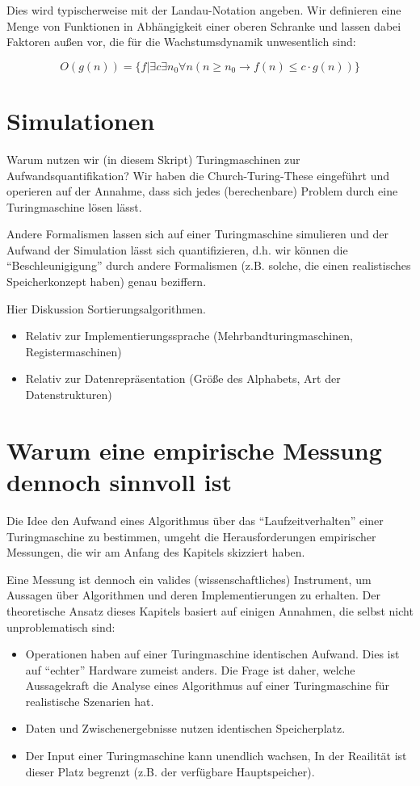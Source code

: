 Dies wird typischerweise mit der Landau-Notation angeben.
Wir definieren eine Menge von Funktionen in Abhängigkeit einer oberen Schranke
und lassen dabei Faktoren außen vor,
die für die Wachstumsdynamik unwesentlich sind:

\[
O(g(n)) = \{f|\exists c \exists n_0 \forall n (n \geq n_0 \rightarrow f(n) \leq c \cdot g(n))\}
\]


\section{Simulationen}

Warum nutzen wir (in diesem Skript) Turingmaschinen zur Aufwandsquantifikation?
Wir haben die Church-Turing-These eingeführt und operieren auf der Annahme,
dass sich jedes (berechenbare) Problem durch eine Turingmaschine lösen lässt.

Andere Formalismen lassen sich auf einer Turingmaschine simulieren und
der Aufwand der Simulation lässt sich quantifizieren,
d.h. wir können die ``Beschleunigigung'' durch andere Formalismen
(z.B. solche, die einen realistisches Speicherkonzept haben)
genau beziffern.

Hier Diskussion Sortierungsalgorithmen.
\begin{itemize}
    \item Relativ zur Implementierungssprache (Mehrbandturingmaschinen, Registermaschinen)
    \item Relativ zur Datenrepräsentation (Größe des Alphabets, Art der Datenstrukturen)
\end{itemize}

\section{Warum eine empirische Messung dennoch sinnvoll ist}
Die Idee den Aufwand eines Algorithmus über das ``Laufzeitverhalten'' einer Turingmaschine zu bestimmen,
umgeht die Herausforderungen empirischer Messungen, die wir am Anfang des Kapitels skizziert haben.

Eine Messung ist dennoch ein valides (wissenschaftliches) Instrument,
um Aussagen über Algorithmen und deren Implementierungen zu erhalten.
Der theoretische Ansatz dieses Kapitels basiert auf einigen Annahmen,
die selbst nicht unproblematisch sind:
\begin{itemize}
  \item Operationen haben auf einer Turingmaschine identischen Aufwand.
    Dies ist auf ``echter'' Hardware zumeist anders.
    Die Frage ist daher, welche Aussagekraft die Analyse eines Algorithmus auf einer Turingmaschine für realistische Szenarien hat. 
  \item Daten und Zwischenergebnisse nutzen identischen Speicherplatz.
  \item Der Input einer Turingmaschine kann unendlich wachsen,
      In der Reailität ist dieser Platz begrenzt (z.B. der verfügbare Hauptspeicher).
\end{itemize}
